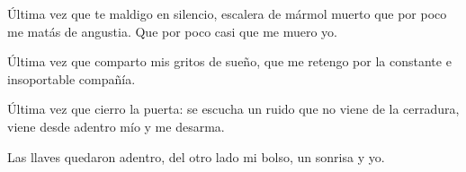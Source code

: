 
Última vez que te maldigo en silencio, escalera de mármol muerto que por poco
me matás de angustia. Que por poco casi que me muero yo.

Última vez que comparto mis gritos de sueño, que me retengo por la constante
e insoportable compañía.

Última vez que cierro la puerta: se escucha un ruido que no viene de la
cerradura, viene desde adentro mío y me desarma.

Las llaves quedaron adentro, del otro lado mi bolso, un sonrisa y yo.


